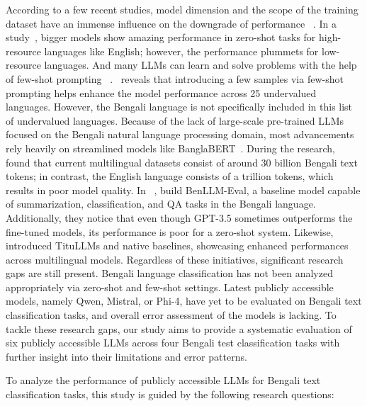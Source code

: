 \documentclass[10pt,letterpaper]{article}
\begin{document}
According to a few recent studies, model dimension and the scope of the training dataset have an immense influence on the downgrade of performance ~\cite{b47}. In a study~\cite{b35}, bigger models show amazing performance in zero-shot tasks for high-resource languages like English; however, the performance plummets for low-resource languages. And many LLMs can learn and solve problems with the help of few-shot prompting ~\cite{b46}.~\cite{b43} reveals that introducing a few samples via few-shot prompting helps enhance the model performance across 25 undervalued languages. However, the Bengali language is not specifically included in this list of undervalued languages. Because of the lack of large-scale pre-trained LLMs focused on the Bengali natural language processing domain, most advancements rely heavily on streamlined models like BanglaBERT~\cite{b4}. During the research,~\cite{b6} found that current multilingual datasets consist of around 30 billion Bengali text tokens; in contrast, the English language consists of a trillion tokens, which results in poor model quality. In ~\cite{b3}, build BenLLM-Eval, a baseline model capable of summarization, classification, and QA tasks in the Bengali language. Additionally, they notice that even though GPT-3.5 sometimes outperforms the fine-tuned models, its performance is poor for a zero-shot system. Likewise,~\cite{b21} introduced TituLLMs and native baselines, showcasing enhanced performances across multilingual models. Regardless of these initiatives, significant research gaps are still present. Bengali language classification has not been analyzed appropriately via zero-shot and few-shot settings. Latest publicly accessible models, namely Qwen, Mistral, or Phi-4, have yet to be evaluated on Bengali text classification tasks, and overall error assessment of the models is lacking. To tackle these research gaps, our study aims to provide a systematic evaluation of six publicly accessible LLMs across four Bengali test classification tasks with further insight into their limitations and error patterns.

To analyze the performance of publicly accessible LLMs for Bengali text classification tasks, this study is guided by the following research questions:
\end{document}
